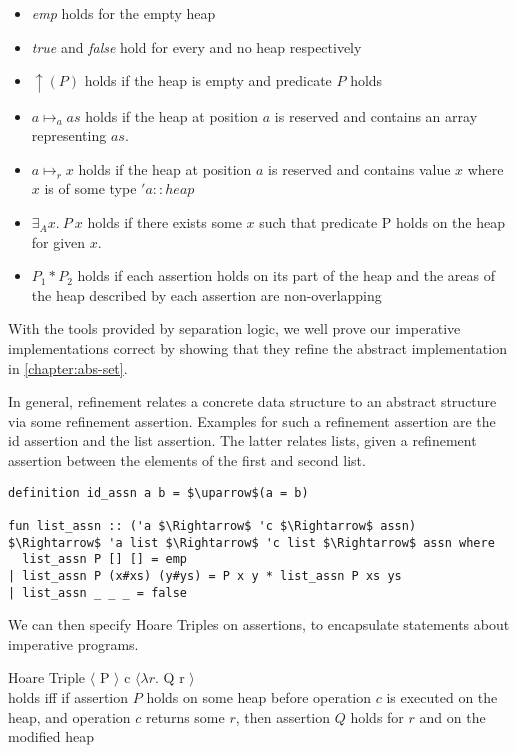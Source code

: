 \begin{itemize}
    \item \textit{emp} holds for the empty heap
    \item \textit{true} and \textit{false} hold for every and no heap respectively
    \item $\uparrow(P)$ holds if the heap is empty and predicate $P$ holds
    \item $a \mapsto_a as$ holds if the heap at position $a$ is reserved and contains
    an array representing $as$.
    \item $a \mapsto_r x$ holds if the heap at position $a$ is reserved and contains
    value $x$ where $x$ is of some type $'a::heap$
    \item $\exists_A x.\ P\ x$ holds if there exists some $x$ such that predicate P
    holds on the heap for given $x$.
    \item $P_1 * P_2$ holds if each assertion holds on its part of the heap
    and the areas of the heap described by each assertion are non-overlapping
\end{itemize}

With the tools provided by separation logic,
we well prove our imperative implementations correct
by showing that they refine the abstract implementation in \autoref{chapter:abs-set}.

In general, refinement relates a concrete data structure
to an abstract structure via some refinement assertion.
Examples for such a refinement assertion are the id assertion and the
list assertion.
The latter relates lists, given a refinement
assertion between the elements of the first and second list.

\begin{lstlisting}[mathescape=true, language=Isabelle]
definition id_assn a b = $\uparrow$(a = b)

fun list_assn :: ('a $\Rightarrow$ 'c $\Rightarrow$ assn) $\Rightarrow$ 'a list $\Rightarrow$ 'c list $\Rightarrow$ assn where
  list_assn P [] [] = emp
| list_assn P (x#xs) (y#ys) = P x y * list_assn P xs ys
| list_assn _ _ _ = false
\end{lstlisting}

We can then specify Hoare Triples on assertions,
to encapsulate statements about imperative programs.

\begin{definition}{Hoare Triple}
    $\langle$ P $\rangle$ c $\langle \lambda r. $ Q r $\rangle$ \\
    holds iff if assertion $P$ holds on some heap before operation $c$
    is executed on the heap,
    and operation $c$ returns some $r$, then assertion $Q$ holds
    for $r$ and on the modified heap
\end{definition}

